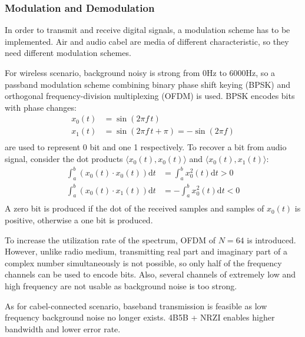 \subsubsection{Modulation and Demodulation}
In order to transmit and receive digital signals, a modulation scheme has to be implemented.
Air and audio cabel are media of different characteristic, so they need different modulation schemes.\par
For wireless scenario, background noisy is strong from 0Hz to 6000Hz,
so a passband modulation scheme
combining binary phase shift keying (BPSK) and orthogonal frequency-division multiplexing (OFDM)
is used.
BPSK encodes bits with phase changes:
\begin{align*}
	x_0(t) & =\sin(2\pi f\, t)                       \\
	x_1(t) & =\sin(2\pi f\, t + \pi) = -\sin(2\pi f) \\
\end{align*}
are used to represent 0 bit and one 1 respectively.
To recover a bit from audio signal, consider the dot products $\langle x_0(t),x_0(t)\rangle$ and $\langle x_0(t),x_1(t) \rangle$:
\begin{align*}
	\int_a^b \left( x_0(t)\cdot x_0(t) \right) \mathrm{d}t & =  \int_a^b x_0^2(t) \mathrm{d}t > 0 \\
	\int_a^b \left( x_0(t)\cdot x_1(t) \right) \mathrm{d}t & = -\int_a^b x_0^2(t) \mathrm{d}t < 0 \\
\end{align*}
A zero bit is produced if the dot of the received samples and samples of $x_0(t)$ is positive, otherwise a one bit is produced.\par
To increase the utilization rate of the spectrum, OFDM of $N=64$ is introduced.
However, unlike radio medium, transmitting real part and imaginary part of a complex number simultaneously is not possible,
so only half of the frequency channels can be used to encode bits.
Also, several channels of extremely low and high frequency are not usable as background noise is too strong.\par
As for cabel-connected scenario, baseband transmission is feasible as low frequency background noise no longer exists.
4B5B + NRZI enables higher bandwidth and lower error rate.

